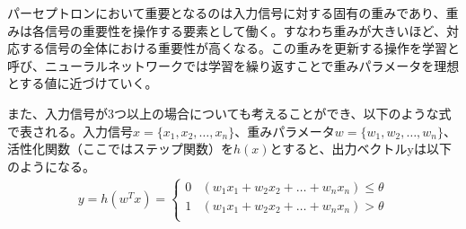 パーセプトロンにおいて重要となるのは入力信号に対する固有の重みであり、重みは各信号の重要性を操作する要素として働く。すなわち重みが大きいほど、対応する信号の全体における重要性が高くなる。この重みを更新する操作を学習と呼び、ニューラルネットワークでは学習を繰り返すことで重みパラメータを理想とする値に近づけていく。

また、入力信号が3つ以上の場合についても考えることができ、以下のような式で表される。入力信号$x = \{ x_1, x_2, \ldots, x_n \}$、重みパラメータ$w = \{ w_1, w_2, \ldots, w_n \}$、活性化関数（ここではステップ関数）を$h(x)$とすると、出力ベクトルyは以下のようになる。
\begin{align}
y = h(w^T x) =
 \begin{cases}
 0 & (w_1x_1 + w_2x_2 + \ldots + w_nx_n) \leq \theta\\
 1 & (w_1x_1 + w_2x_2 + \ldots + w_nx_n) > \theta \\
 \end{cases}
\end{align}
